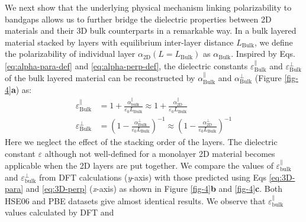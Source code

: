 \documentclass[journal=ancac3,manuscript=article,email=true,hyperref=true,keywords=false]{achemso}
\begin{document}

We next show that the underlying physical mechanism linking 
polarizability to bandgaps allows us to further bridge 
the dielectric properties between 2D materials and 
their 3D bulk counterparts in a remarkable way. 
%
%
%
In a bulk layered material stacked by layers with equilibrium
inter-layer distance $L_{\mathrm{Bulk}}$, we define the polarizability
of individual layer $\alpha_{\mathrm{2D}}(L=L_{\mathrm{Bulk}})$ as
$\alpha_{\mathrm{Bulk}}$. Inspired by Eqs. \ref{eq:alpha-para-def} and
\ref{eq:alpha-perp-def}, the dielectric constants
$\varepsilon^{\parallel}_{\mathrm{Bulk}}$ and
$\varepsilon^{\perp}_{\mathrm{Bulk}}$ of the bulk layered material can
be reconstructed by $\alpha_{\mathrm{Bulk}}^{\parallel}$ and
$\alpha_{\mathrm{Bulk}}^{\perp}$ (Figure \ref{fig-4}{\textbf a}) as:
%
%
\begin{subequations}
\begin{align}
  \label{eq:3D-para}
  \varepsilon^{\parallel}_{\mathrm{Bulk}}
  &= 1 + \frac{\alpha_{\mathrm{bulk}}^{\parallel}}{\varepsilon_{0} L_{\mathrm{Bulk}}}
  \approx 1 + \frac{\alpha_{\mathrm{2D}}^{\parallel}}{\varepsilon_{0} L_{\mathrm{Bulk}}} \\
  \label{eq:3D-perp}
  \varepsilon^{\perp}_{\mathrm{Bulk}}
  &= \left(1 - \frac{\alpha_{\mathrm{Bulk}}^{\perp}}{\varepsilon_{0} L_{\mathrm{Bulk}}}\right)^{-1}
  \approx \left(1 - \frac{\alpha_{\mathrm{2D}}^{\perp}}{\varepsilon_{0} L_{\mathrm{Bulk}}}\right)^{-1}
\end{align}
\end{subequations}
%
%
Here we neglect the effect of the stacking order of the layers.  The
dielectric constant $\varepsilon$ although not well-defined for a
monolayer 2D material becomes applicable when the 2D layers are put
together.
%
We compare the values of
$\varepsilon_{\mathrm{bulk}}^{\parallel}$ and
$\varepsilon_{\mathrm{bulk}}^{\perp}$ from DFT calculations (\textit{y}-axis)
with those predicted using Eqs \ref{eq:3D-para} and \ref{eq:3D-perp}
(\textit{x}-axis) as shown in Figure \ref{fig-4}{\textbf b} and \ref{fig-4}{\textbf c}. 
Both HSE06 and PBE datasets give almost identical results.  
%
We observe that
$\varepsilon_{\mathrm{bulk}}^{\parallel}$ values calculated by DFT and
\end{document}
